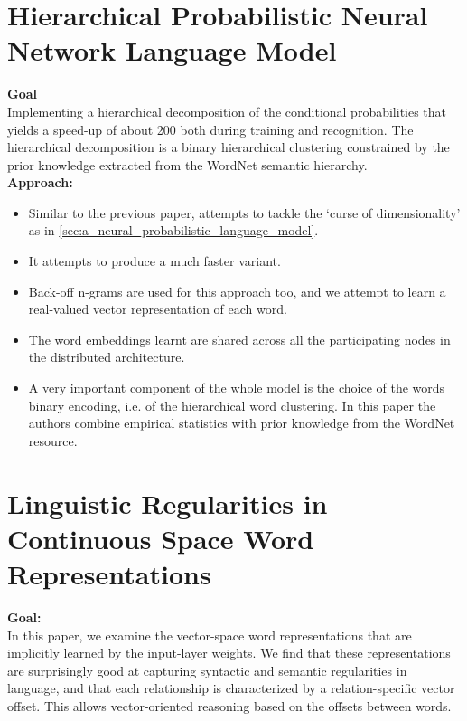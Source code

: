 \documentclass[11pt,a4paper]{article}
\begin{document}


\section{Hierarchical Probabilistic Neural Network Language Model} %
\label{sec:hierarchical_probabilistic_neural_network_language_model}

  \textbf{Goal}\\
  Implementing a  hierarchical decomposition of the conditional probabilities that yields a speed-up of about 200 both during training and recognition. The hierarchical decomposition is a binary hierarchical clustering constrained by the prior knowledge extracted from the WordNet semantic hierarchy.\\

  \textbf{Approach:}
  \begin{itemize}
    \item 
    Similar to the previous paper, attempts to tackle the `curse of dimensionality' as in \ref{sec:a_neural_probabilistic_language_model}. 
    \item 
    It attempts to produce a much faster variant.
    \item 
    Back-off n-grams are used for this approach too, and we attempt to learn a real-valued vector representation of each word.
    \item 
    The word embeddings learnt are shared across all the participating nodes in the distributed architecture.
    \item 
    A very important component of the whole model is the choice of the words binary encoding, i.e. of the hierarchical word clustering. In this paper the authors combine empirical statistics with prior knowledge from the WordNet resource.
  \end{itemize}



\section{Linguistic Regularities in Continuous Space Word Representations} %
\label{sec:linguistic_regularities_in_continuous_space_word_representations}


  \textbf{Goal:}\\
  In this paper, we examine the vector-space word representations that are implicitly learned by the input-layer weights. We find that these representations are surprisingly good at capturing syntactic and semantic regularities in language, and that each relationship is characterized by a relation-specific vector offset. This allows vector-oriented reasoning based on the offsets between words. \cite{mikolov2013linguistic} \\
\end{document}
